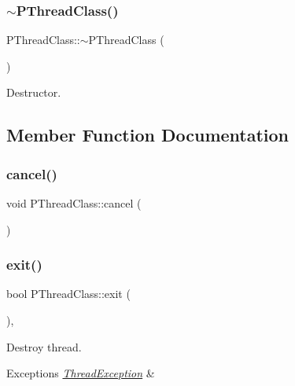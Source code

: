 \subsubsection{\texorpdfstring{$\sim$\+P\+Thread\+Class()}{~PThreadClass()}}
{\footnotesize\ttfamily P\+Thread\+Class\+::$\sim$\+P\+Thread\+Class (\begin{DoxyParamCaption}{ }\end{DoxyParamCaption})\hspace{0.3cm}{\ttfamily [virtual]}}



Destructor. 



\subsection{Member Function Documentation}
\mbox{\label{classPThreadClass_a6e4fffd986c68d60ef3c089293007eab}} 
\subsubsection{\texorpdfstring{cancel()}{cancel()}}
{\footnotesize\ttfamily void P\+Thread\+Class\+::cancel (\begin{DoxyParamCaption}{ }\end{DoxyParamCaption})\hspace{0.3cm}{\ttfamily [inline]}}

\mbox{\label{classPThreadClass_a699d636eda769173287c18bd1a5f4a77}} 
\subsubsection{\texorpdfstring{exit()}{exit()}}
{\footnotesize\ttfamily bool P\+Thread\+Class\+::exit (\begin{DoxyParamCaption}{ }\end{DoxyParamCaption})\hspace{0.3cm}{\ttfamily [virtual]}, {\ttfamily [noexcept]}}

Destroy thread. 
\begin{DoxyExceptions}{Exceptions}
{\em \hyperlink{classThreadException}{Thread\+Exception}} & \\
\hline
\end{DoxyExceptions}
\mbox{\label{classPThreadClass_a9a1dc6820222741276087d0323905b4d}} 
